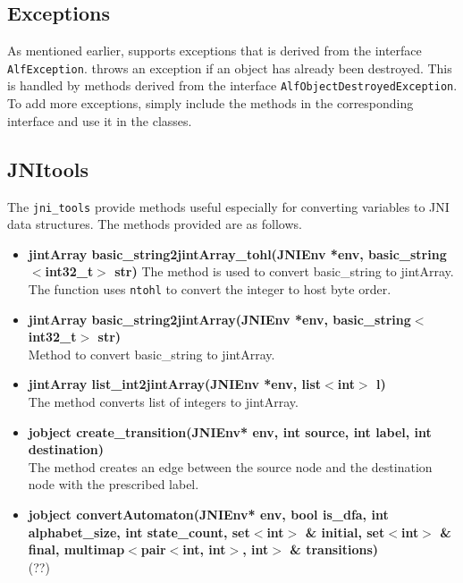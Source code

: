 \subsection{Exceptions}
As mentioned earlier, \jalf supports exceptions that is derived from the interface \texttt{AlfException}. \jalf throws an exception if an object has already been destroyed. This is handled by methods derived from the interface \texttt{AlfObjectDestroyedException}. To add more exceptions, simply include the methods in the corresponding interface and use it in the classes. 
   
\subsection{JNItools}
The \texttt{jni\_tools} provide methods useful especially for converting variables to JNI data structures. The methods provided are as follows.
\begin{itemize}
 \item \textbf{jintArray basic\_string2jintArray\_tohl(JNIEnv *env, basic\_string$<$int32\_t$>$ str)}
	The method is used to convert basic\_string to jintArray. The function uses \texttt{ntohl} to convert the integer to host byte order. 
 \item \textbf{jintArray basic\_string2jintArray(JNIEnv *env, basic\_string$<$int32\_t$>$ str)} \\ 
	Method to convert basic\_string to jintArray.
 \item \textbf{jintArray list\_int2jintArray(JNIEnv *env, list$<$int$>$ l)} \\
	The method converts list of integers to jintArray.
 \item \textbf{jobject create\_transition(JNIEnv* env, int source, int label, int destination)} \\
	The method creates an edge between the source node and the destination node with the prescribed label.
 \item \textbf{jobject convertAutomaton(JNIEnv* env, bool is\_dfa, int alphabet\_size, int state\_count, set$<$int$>$ \& initial, set$<$int$>$ \& final, multimap$<$pair$<$int, int$>$, int$>$ \& transitions)}\\ (??)

\end{itemize}


